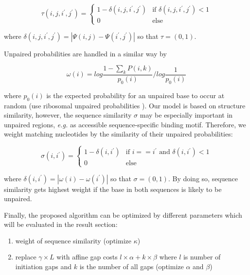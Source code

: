 \documentclass[a4paper,twoside]{article}
\newcommand\eg{\textit{e.g.}}
\begin{document}
\begin{equation}
	\tau(i,j,i^\prime,j^\prime) = \left\{ \begin{array}{cl}
			1 - \delta(i,j,i^\prime,j^\prime) & \textrm{if }\delta(i,j,i^\prime,j^\prime) < 1 \\
			0 & \textrm{else}
		\end{array}\right.
\end{equation}

where $\delta(i,j,i^\prime,j^\prime) = | \Psi(i,j) - \Psi(i^\prime,j^\prime) |$
so that $\tau = (0,1)$. 

Unpaired probabilities are handled in a similar way by

\begin{equation}
	\omega(i) = log \frac{1 - \sum_k P(i,k)}{p_0(i)} / log \frac{1}{p_0(i)}
\end{equation}

where $p_0(i)$ is the expected probability for an unpaired base to occur at
random (use ribosomal unpaired probabilities
\cite{Knudsen:Hein:RNA_secon_struc:1999}). Our model is based on structure
similarity, however, the sequence similarity $\sigma$ may be especially
important in unpaired regions, \eg{} as accessible sequence-specific binding
motif.  Therefore, we weight matching nucleotides by the similarity of their
unpaired probabilities:

\begin{equation}
	\sigma(i,i^\prime) = \left\{ \begin{array}{cl}
			1 - \delta(i,i^\prime) & \textrm{if }i == i^\prime \textrm{ and } \delta(i,i^\prime) < 1 \\
			0 & \textrm{else}
		\end{array}\right.
\end{equation}

where $\delta(i,i^\prime) = | \omega(i) - \omega(i^\prime) |$ so that $\sigma = (0,1)$.  By
doing so, sequence similarity gets highest weight if the base in both sequences
is likely to be unpaired.

Finally, the proposed algorithm can be optimized by different parameters which
will be evaluated in the result section:

\begin{enumerate}
\item weight of sequence similarity (optimize $\kappa$)
\item replace $\gamma \times L$ with affine gap costs $l \times \alpha + k
\times \beta$ where $l$ is number of initiation gaps and $k$ is the number of
all gaps (optimize $\alpha$ and $\beta$)
\end{enumerate}
\end{document}
